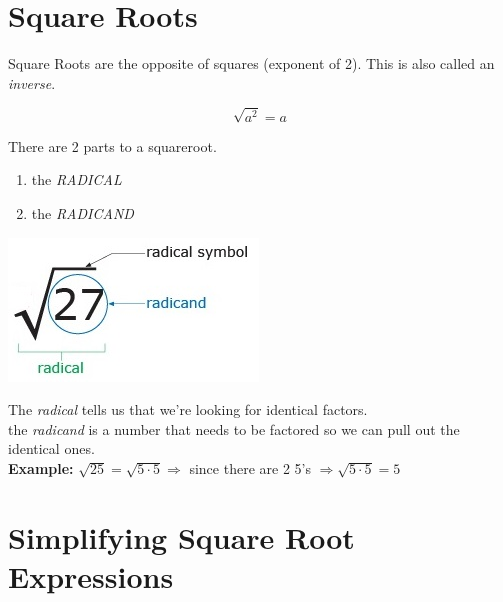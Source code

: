 \documentclass[12pt]{article}
\begin{document}
\pagebreak

\section*{Square Roots}

Square Roots are the opposite of squares (exponent of 2). This is also called an \textit{inverse}.\\

\begin{LARGE}
	$$\sqrt{a^2}=a$$
\end{LARGE}



\hrulefill

There are 2 parts to a squareroot.

\begin{enumerate}

	\item the \textit{RADICAL}\\
	
	\item the \textit{RADICAND}\\
	
\end{enumerate}

\begin{center}
\includegraphics[scale=.7]{squareroot.jpg}
\end{center}


The \textit{radical} tells us that we're looking for identical factors.\\

the \textit{radicand} is a number that needs to be factored so we can pull out the identical ones.\\

\textbf{Example:} $\sqrt{25}=\sqrt{5\cdot5} \Longrightarrow$ since there are 2 5's $\Longrightarrow \sqrt{5\cdot5}=5$\\

\pagebreak

\section*{Simplifying Square Root Expressions}
\end{document}
